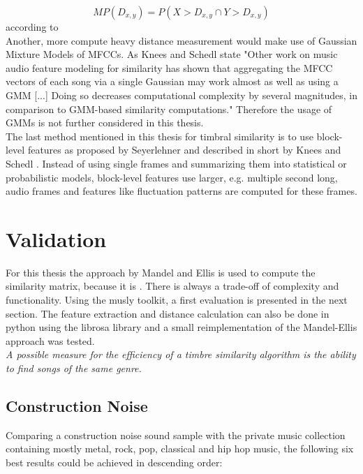 \begin{equation} \label{eq:mp2}
MP(D_{x,y}) = P(X > D_{x,y} \cap Y > D_{x,y})
\end{equation}
according to \cite[p. 80]{knees1}
\ \\
Another, more compute heavy distance measurement would make use of Gaussian Mixture Models of MFCCs. As Knees and Schedl state "Other work on music audio feature modeling for similarity has shown that aggregating the MFCC vectors of each song via a single Gaussian may work almost as well as using a GMM [...] Doing so decreases computational complexity by several magnitudes, in comparison to GMM-based similarity computations." \cite[p. 65]{knees1} Therefore the usage of GMMs is not further considered in this thesis.
\ \\
The last method mentioned in this thesis for timbral similarity is to use block-level features as proposed by Seyerlehner \cite{seyerlehnerblock} and described in short by Knees and Schedl \cite[p. 67]{knees1}. 
Instead of using single frames and summarizing them into statistical or probabilistic models, block-level features use larger, e.g. multiple second long, audio frames and features like fluctuation patterns are computed for these frames. 

\section{Validation}

For this thesis the approach by Mandel and Ellis is used to compute the similarity matrix, because it is . There is always a trade-off of complexity and functionality. 
Using the musly toolkit, a first evaluation is presented in the next section. 
The feature extraction and distance calculation can also be done in python using the librosa library and a small reimplementation of the Mandel-Ellis approach was tested.\\
\textit{A possible measure for the efficiency of a timbre similarity algorithm is the ability to find songs of the same genre.}

\subsection{Construction Noise}
Comparing a construction noise sound sample with the private music collection containing mostly metal, rock, pop, classical and hip hop music, the following six best results could be achieved in descending order: 

